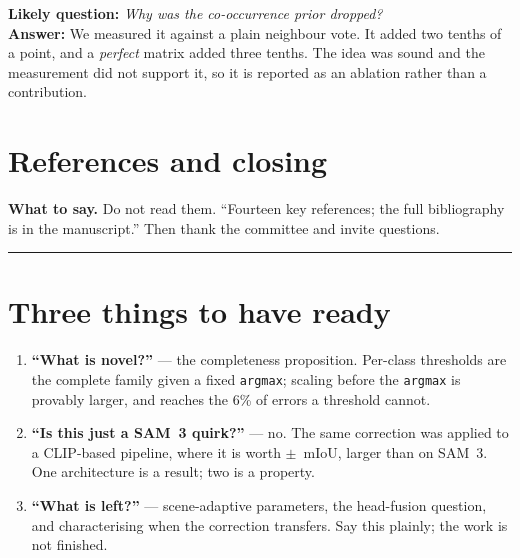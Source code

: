 \documentclass[11pt,a4paper]{article}
\newcommand{\best}[1]{\textcolor{acc}{\textbf{#1}}}
\newcommand{\say}[1]{\par\smallskip\noindent\textbf{What to say.} #1}
\newcommand{\ask}[2]{\par\smallskip\noindent\textbf{Likely question:} \emph{#1}\\
  \textbf{Answer:} #2}
\begin{document}
\ask{Why was the co-occurrence prior dropped?}{We measured it against a plain
neighbour vote. It added two tenths of a point, and a \emph{perfect} matrix added
three tenths. The idea was sound and the measurement did not support it, so it is
reported as an ablation rather than a contribution.}

\section{References and closing}
\say{Do not read them. ``Fourteen key references; the full bibliography is in the
manuscript.'' Then thank the committee and invite questions.}

\bigskip\hrule\bigskip
\section*{Three things to have ready}
\begin{enumerate}[leftmargin=1.6em]
  \item \best{``What is novel?''} --- the completeness proposition. Per-class
        thresholds are the complete family given a fixed \texttt{argmax}; scaling
        before the \texttt{argmax} is provably larger, and reaches the 6\% of
        errors a threshold cannot.
  \item \best{``Is this just a SAM~3 quirk?''} --- no. The same correction was
        applied to a CLIP-based pipeline, where it is worth \cnCV{}$\pm$\cnCVsd{}~mIoU,
        larger than on SAM~3. One architecture is a result; two is a property.
  \item \best{``What is left?''} --- scene-adaptive parameters, the head-fusion
        question, and characterising when the correction transfers. Say this
        plainly; the work is not finished.
\end{enumerate}
\end{document}

